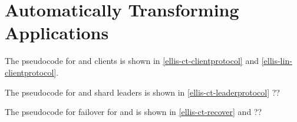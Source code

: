 \section{Automatically Transforming Applications}





The pseudocode for \ect{} and \elin{} clients is shown in \cref{ellis-ct-clientprotocol} and \cref{ellis-lin-clientprotocol}. 

The pseudocode for \ect{} and \elin{} shard leaders is shown in \cref{ellis-ct-leaderprotocol} ??%

The pseudocode for failover for \ect{} and \elin{} is shown in \cref{ellis-ct-recover} and ??%








\providecommand{\atomicAdd}{\textsc{AtomicAdd}}

\providecommand{\sortps}{\textsc{sortByLamportEpoch}}

\providecommand{\executeRetClie}{\textsc{executeAndSubmitOpReply}}

\providecommand{\clientSubmit}{\textsc{Submit}}

\providecommand{\leaderHandleAccept}{\textsc{Leader::AcceptRespRecv}}

\providecommand{\leaderHandleFinalAccept}{\textsc{Leader::FinalAcceptRespRecv}}

\providecommand{\clientWait}{\textsc{AwaitResponse}}
\providecommand{\ReceiveAny}{\textsc{ReceiveAny}}
\providecommand{\RequestReply}{\textsc{OperationResponse}}

\providecommand{\Recover}{\textsc{NewLeader::Recover}}

\providecommand{\getPredecessor}{\textsc{Leader::GetPredecessorTS}}

\providecommand{\getSuccessor}{\textsc{Leader::GetSuccessorTS}}

\providecommand{\getChain}{\textsc{Leader::GetTimestampChain}}

\providecommand{\leaderSubmit}{\textsc{OperationRequestRecv}}

\providecommand{\clientToLeader}{\textsc{OperationRequest}}

